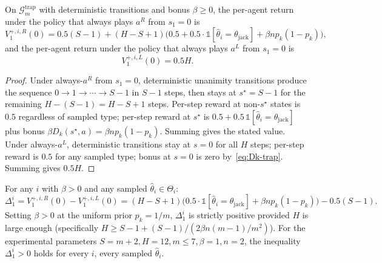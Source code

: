 \begin{lemma}
\label{lem:value-trajectories}
On $\mathcal{G}_m^{\mathrm{trap}}$ with deterministic transitions and bonus $\beta \geq 0$, the per-agent return under the policy that always plays $a^R$ from $s_1 = 0$ is
\begin{equation}
V^{+, i, R}_1(0) = 0.5(S-1) + (H - S + 1)\big(0.5 + 0.5 \cdot \mathbb{1}[\hat\theta_i = \theta_{\mathrm{jack}}] + \beta n p_k(1 - p_k)\big),
\end{equation}
and the per-agent return under the policy that always plays $a^L$ from $s_1 = 0$ is
\begin{equation}
V^{+, i, L}_1(0) = 0.5 H.
\end{equation}
\end{lemma}

\begin{proof}
Under always-$a^R$ from $s_1 = 0$, deterministic unanimity transitions produce the sequence $0 \to 1 \to \cdots \to S-1$ in $S-1$ steps, then stays at $s^\star = S-1$ for the remaining $H - (S - 1) = H - S + 1$ steps. Per-step reward at non-$s^\star$ states is $0.5$ regardless of sampled type; per-step reward at $s^\star$ is $0.5 + 0.5\,\mathbb{1}[\hat\theta_i = \theta_{\mathrm{jack}}]$ plus bonus $\beta D_k(s^\star, a) = \beta n p_k(1-p_k)$. Summing gives the stated value. Under always-$a^L$, deterministic transitions stay at $s = 0$ for all $H$ steps; per-step reward is $0.5$ for any sampled type; bonus at $s = 0$ is zero by~\eqref{eq:Dk-trap}. Summing gives $0.5 H$.
\end{proof}

\begin{lemma}
\label{lem:preference-bonus}
For any $i$ with $\beta > 0$ and any sampled $\hat\theta_i \in \Theta_i$:
\begin{equation}
\Delta^i_1 = V^{+, i, R}_1(0) - V^{+, i, L}_1(0) = (H - S + 1)\big(0.5 \cdot \mathbb{1}[\hat\theta_i = \theta_{\mathrm{jack}}] + \beta n p_k(1 - p_k)\big) - 0.5(S - 1).
\end{equation}
Setting $\beta > 0$ at the uniform prior $p_k = 1/m$, $\Delta^i_1$ is strictly positive provided $H$ is large enough (specifically $H \geq S - 1 + (S-1) / (2\beta n (m-1)/m^2)$). For the experimental parameters $S = m+2, H = 12, m \leq 7, \beta = 1, n = 2$, the inequality $\Delta^i_1 > 0$ holds for every $i$, every sampled $\hat\theta_i$.
\end{lemma}

